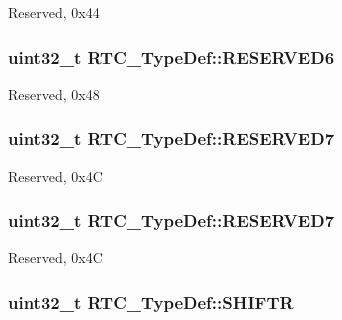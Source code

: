 Reserved, 0x44 \hypertarget{struct_r_t_c___type_def_ae3991ef129a612831298cffd6b750307}{
\subsubsection[{R\-E\-S\-E\-R\-V\-E\-D6}]{\setlength{\rightskip}{0pt plus 5cm}uint32\-\_\-t R\-T\-C\-\_\-\-Type\-Def\-::\-R\-E\-S\-E\-R\-V\-E\-D6}}\label{struct_r_t_c___type_def_ae3991ef129a612831298cffd6b750307}
Reserved, 0x48 \hypertarget{struct_r_t_c___type_def_a09936292ef8d82974b55a03a1080534e}{
\subsubsection[{R\-E\-S\-E\-R\-V\-E\-D7}]{\setlength{\rightskip}{0pt plus 5cm}uint32\-\_\-t R\-T\-C\-\_\-\-Type\-Def\-::\-R\-E\-S\-E\-R\-V\-E\-D7}}\label{struct_r_t_c___type_def_a09936292ef8d82974b55a03a1080534e}
Reserved, 0x4\-C \hypertarget{struct_r_t_c___type_def_a09936292ef8d82974b55a03a1080534e}{
\subsubsection[{R\-E\-S\-E\-R\-V\-E\-D7}]{\setlength{\rightskip}{0pt plus 5cm}uint32\-\_\-t R\-T\-C\-\_\-\-Type\-Def\-::\-R\-E\-S\-E\-R\-V\-E\-D7}}\label{struct_r_t_c___type_def_a09936292ef8d82974b55a03a1080534e}
Reserved, 0x4\-C \hypertarget{struct_r_t_c___type_def_a6082856c9191f5003b6163c0d3afcaff}{
\subsubsection[{S\-H\-I\-F\-T\-R}]{ uint32\-\_\-t R\-T\-C\-\_\-\-Type\-Def\-::\-S\-H\-I\-F\-T\-R}}\label{struct_r_t_c___type_def_a6082856c9191f5003b6163c0d3afcaff}
